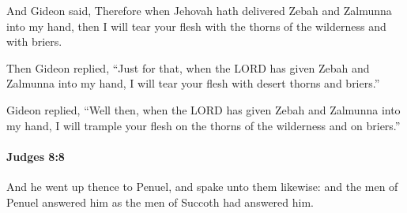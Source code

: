 			\begin{versebox}
					\item[BHS] 
					\item[ASV] And Gideon said, Therefore when Jehovah hath delivered Zebah and Zalmunna into my hand, then I will tear your flesh with the thorns of the wilderness and with briers.
					\item[NIV] Then Gideon replied, “Just for that, when the LORD has given Zebah and Zalmunna into my hand, I will tear your flesh with desert thorns and briers.”
					\item[NRSV] Gideon replied, “Well then, when the LORD has given Zebah and Zalmunna into my hand, I will trample your flesh on the thorns of the wilderness and on briers.”
			\end{versebox}

		\paragraph{Judges 8:8} %
			\label{JUDGES-8-8}

			And he went up thence to Penuel, and spake unto them likewise: and the men of Penuel answered him as the men of Succoth had answered him.

